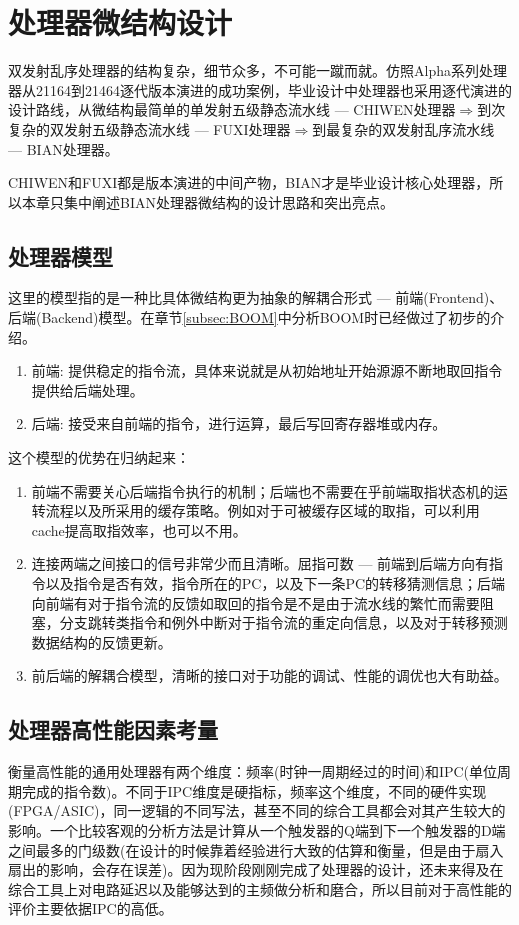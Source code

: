 \chapter{处理器微结构设计}\label{chap:design}
双发射乱序处理器的结构复杂，细节众多，不可能一蹴而就。仿照Alpha系列处理器从21164到21464逐代版本演进的成功案例，毕业设计中处理器也采用逐代演进的设计路线，从微结构最简单的单发射五级静态流水线 --- CHIWEN处理器$ \Rightarrow $到次复杂的双发射五级静态流水线 --- FUXI处理器$ \Rightarrow $到最复杂的双发射乱序流水线 --- BIAN处理器。

CHIWEN和FUXI都是版本演进的中间产物，BIAN才是毕业设计核心处理器，所以本章只集中阐述BIAN处理器微结构的设计思路和突出亮点。
\section{处理器模型}\label{sec:model}
这里的模型指的是一种比具体微结构更为抽象的解耦合形式 --- 前端(Frontend)、后端(Backend)模型。在章节\ref{subsec:BOOM}中分析BOOM时已经做过了初步的介绍。
\begin{enumerate}[label=(\alph*)]
	\item 前端: 提供稳定的指令流，具体来说就是从初始地址开始源源不断地取回指令提供给后端处理。
	\item 后端: 接受来自前端的指令，进行运算，最后写回寄存器堆或内存。
\end{enumerate}
这个模型的优势在归纳起来：
\begin{enumerate}[label=(\alph*)]
	\item 前端不需要关心后端指令执行的机制；后端也不需要在乎前端取指状态机的运转流程以及所采用的缓存策略。例如对于可被缓存区域的取指，可以利用cache提高取指效率，也可以不用。
	\item 连接两端之间接口的信号非常少而且清晰。屈指可数 --- 前端到后端方向有指令以及指令是否有效，指令所在的PC，以及下一条PC的转移猜测信息；后端向前端有对于指令流的反馈如取回的指令是不是由于流水线的繁忙而需要阻塞，分支跳转类指令和例外中断对于指令流的重定向信息，以及对于转移预测数据结构的反馈更新。
	\item 前后端的解耦合模型，清晰的接口对于功能的调试、性能的调优也大有助益。
\end{enumerate}
 
\section{处理器高性能因素考量}
衡量高性能的通用处理器有两个维度：频率(时钟一周期经过的时间)和IPC(单位周期完成的指令数)。不同于IPC维度是硬指标，频率这个维度，不同的硬件实现(FPGA/ASIC)，同一逻辑的不同写法，甚至不同的综合工具都会对其产生较大的影响。一个比较客观的分析方法是计算从一个触发器的Q端到下一个触发器的D端之间最多的门级数(在设计的时候靠着经验进行大致的估算和衡量，但是由于扇入扇出的影响，会存在误差)。因为现阶段刚刚完成了处理器的设计，还未来得及在综合工具上对电路延迟以及能够达到的主频做分析和磨合，所以目前对于高性能的评价主要依据IPC的高低。

